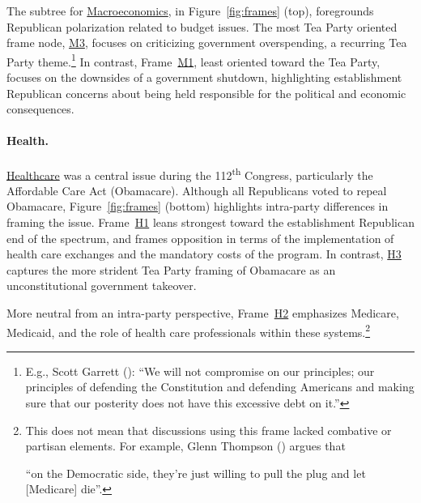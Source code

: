 The \name{} subtree for \underline{Macroeconomics}, in Figure~\ref{fig:frames} (top), foregrounds Republican polarization related to budget issues.
 The most Tea Party oriented frame node, \underline{M3}, focuses on
criticizing government overspending, a recurring Tea Party theme.\footnote{E.g., Scott Garrett (): ``We will not compromise on
  our principles; our principles of defending the Constitution and
  defending Americans and making sure that our posterity does not have
  this excessive debt on it.''}  In contrast, Frame~\underline{M1},
least oriented toward the Tea Party, focuses on the downsides
of a government shutdown, highlighting establishment Republican
concerns about being held responsible for the political and economic
consequences.

\paragraph{Health.}

\underline{Healthcare} was a central issue during the 112\textsuperscript{th}
Congress, particularly the Affordable Care Act (Obamacare). Although all
Republicans voted to repeal Obamacare, Figure~\ref{fig:frames} (bottom) highlights
intra-party differences in framing the issue. Frame~\underline{H1} leans strongest toward
the establishment Republican end of the spectrum, and frames opposition in terms of
the implementation of health care exchanges and the mandatory costs of the
program. In contrast, \underline{H3} captures the more strident Tea Party framing of Obamacare as an unconstitutional government takeover.
More neutral from an intra-party perspective,
Frame~\underline{H2} emphasizes Medicare, Medicaid, and the role of health
care professionals within these systems.\footnote{This does not mean that discussions using this frame
  lacked combative or partisan elements. For example, Glenn Thompson
  () argues that  ``on the
  Democratic side, they're just willing to pull the plug and let
  [Medicare] die''. }


